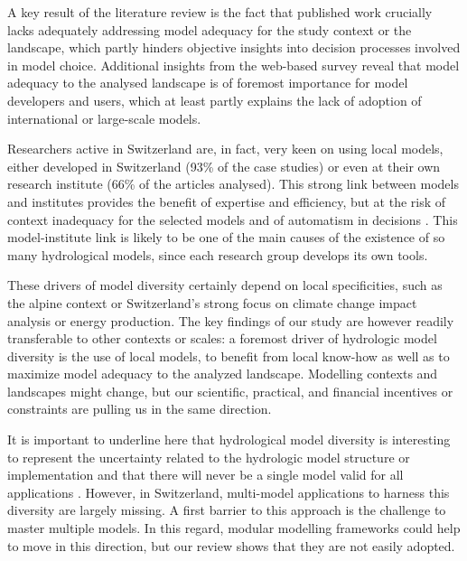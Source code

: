 \documentclass[10pt,a4paper]{article}
\begin{document}
A key result of the literature review is the fact that published work crucially lacks adequately addressing model adequacy for the study context or the landscape, which partly hinders objective insights into decision processes involved in model choice. Additional insights from the web-based survey reveal that model adequacy to the analysed landscape is of foremost importance for model developers and users, which at least partly explains the lack of adoption of international or large-scale models. 

Researchers active in Switzerland are, in fact, very keen on using local models, either developed in Switzerland (93\% of the case studies) or even at their own research institute (66\% of the articles analysed). This strong link between models and institutes provides the benefit of expertise and efficiency, but at the risk of context inadequacy for the selected models and of automatism in decisions \citep{Babel2019}. This model-institute link is likely to be one of the main causes of the existence of so many hydrological models, since each research group develops its own tools.

These drivers of model diversity certainly depend on local specificities, such as the alpine context or Switzerland's strong focus on climate change impact analysis or energy production. The key findings of our study are however readily transferable to other contexts or scales: a foremost driver of hydrologic model diversity is the use of local models, to benefit from local know-how as well as to maximize model adequacy to the analyzed landscape. Modelling contexts and landscapes might change, but our scientific, practical, and financial incentives or constraints are pulling us in the same direction.

It is important to underline here that hydrological model diversity is interesting to represent the uncertainty related to the hydrologic model structure or implementation \citep{Babel2019} and that there will never be a single model valid for all applications \citep{Hamalainen2015}. However, in Switzerland, multi-model applications to harness this diversity are largely missing. A first barrier to this approach is the challenge to master multiple models. In this regard, modular modelling frameworks could help to move in this direction, but our review shows that they are not easily adopted. 
\end{document}
